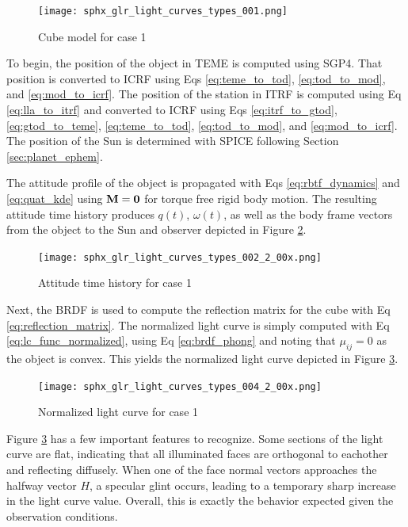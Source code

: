 \graphicspath{{/Users/liamrobinson/Documents/PyLightCurves/docs/build/html/_images}}
\begin{figure}[!htb]
  \centering
  \texttt{[image: sphx\_glr\_light\_curves\_types\_001.png]}
  \caption{Cube model for case 1}
  \label{fig:case1_obj}
\end{figure}

To begin, the position of the object in TEME is computed using SGP4. That position is converted to ICRF using Eqs \ref{eq:teme_to_tod}, \ref{eq:tod_to_mod}, and \ref{eq:mod_to_icrf}. The position of the station in ITRF is computed using Eq \ref{eq:lla_to_itrf} and converted to ICRF using Eqs \ref{eq:itrf_to_gtod}, \ref{eq:gtod_to_teme}, \ref{eq:teme_to_tod}, \ref{eq:tod_to_mod}, and \ref{eq:mod_to_icrf}. The position of the Sun is determined with SPICE following Section \ref{sec:planet_ephem}. 

The attitude profile of the object is propagated with Eqs \ref{eq:rbtf_dynamics} and \ref{eq:quat_kde} using $\mathbf{M}=\mathbf{0}$ for torque free rigid body motion. The resulting attitude time history produces $q(t)$, $\omega(t)$, as well as the body frame vectors from the object to the Sun and observer depicted in Figure \ref{fig:case1_attitude}.

\begin{figure}[!htb]
  \centering
  \texttt{[image: sphx\_glr\_light\_curves\_types\_002\_2\_00x.png]}
  \caption{Attitude time history for case 1}
  \label{fig:case1_attitude}
\end{figure}

Next, the BRDF is used to compute the reflection matrix for the cube with Eq \ref{eq:reflection_matrix}. The normalized light curve is simply computed with Eq \ref{eq:lc_func_normalized}, using Eq \ref{eq:brdf_phong} and noting that $\mu_{ij} = 0$ as the object is convex. This yields the normalized light curve depicted in Figure \ref{fig:case1_lc}.

\begin{figure}[!htb]
  \centering
  \texttt{[image: sphx\_glr\_light\_curves\_types\_004\_2\_00x.png]}
  \caption{Normalized light curve for case 1}
  \label{fig:case1_lc}
\end{figure}

Figure \ref{fig:case1_lc} has a few important features to recognize. Some sections of the light curve are flat, indicating that all illuminated faces are orthogonal to eachother and reflecting diffusely. When one of the face normal vectors approaches the halfway vector $H$, a specular glint occurs, leading to a temporary sharp increase in the light curve value. Overall, this is exactly the behavior expected given the observation conditions.

